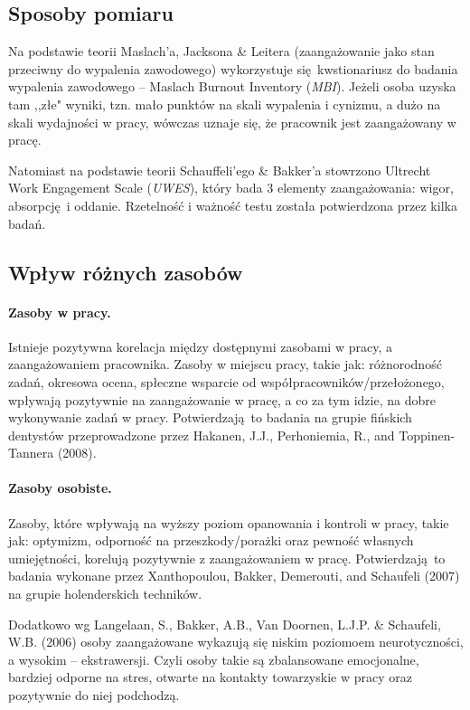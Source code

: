 \subsection{Sposoby pomiaru}
Na podstawie teorii Maslach'a, Jacksona \& Leitera (zaangażowanie jako stan przeciwny do wypalenia zawodowego) wykorzystuje się kwstionariusz do badania wypalenia zawodowego -- Maslach Burnout Inventory (\emph{MBI}). Jeżeli osoba uzyska tam ,,złe" wyniki, tzn. mało punktów na skali wypalenia i cynizmu, a dużo na skali wydajności w pracy, wówczas uznaje się, że pracownik jest zaangażowany w pracę.

Natomiast na podstawie teorii Schauffeli'ego \& Bakker'a stowrzono Ultrecht Work Engagement Scale (\emph{UWES}), który bada 3 elementy zaangażowania: wigor, absorpcję i oddanie. Rzetelność i ważność testu została potwierdzona przez kilka badań.

\subsection{Wpływ różnych zasobów}
\paragraph{Zasoby w pracy.}
Istnieje pozytywna korelacja między dostępnymi zasobami w pracy, a zaangażowaniem pracownika. Zasoby w miejscu pracy, takie jak: różnorodność zadań, okresowa ocena, spłeczne wsparcie od współpracowników/przełożonego, wpływają pozytywnie na zaangażowanie w pracę, a co za tym idzie, na dobre wykonywanie zadań w pracy. Potwierdzają to badania na grupie fińskich dentystów przeprowadzone przez Hakanen, J.J., Perhoniemia, R., and Toppinen-Tannera (2008).
\paragraph{Zasoby osobiste.}
Zasoby, które wpływają na wyższy poziom opanowania i kontroli w pracy, takie jak: optymizm, odporność na przeszkody/porażki oraz pewność własnych umiejętności, korelują pozytywnie z zaangażowaniem w pracę. Potwierdzają to badania wykonane przez Xanthopoulou, Bakker, Demerouti, and Schaufeli (2007) na grupie holenderskich techników.

Dodatkowo wg Langelaan, S., Bakker, A.B., Van Doornen, L.J.P. \& Schaufeli, W.B. (2006) osoby zaangażowane wykazują się niskim poziomoem neurotyczności, a wysokim -- ekstrawersji. Czyli osoby takie są zbalansowane emocjonalne, bardziej odporne na stres, otwarte na kontakty towarzyskie w pracy oraz pozytywnie do niej podchodzą. 

